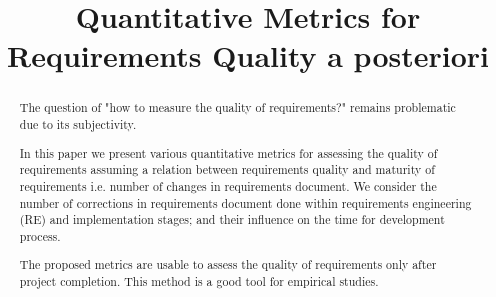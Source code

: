 \documentclass[conference]{IEEEtran}
\begin{document}
\title{Quantitative Metrics for Requirements Quality a posteriori} 

\author{
}

\maketitle

\begin{abstract}
The question of "how to measure the quality of requirements?" remains problematic due to its subjectivity.

In this paper we present various quantitative metrics for assessing the quality of requirements 
assuming a relation between requirements quality and maturity of requirements i.e. number of changes 
in requirements document. We consider the number of corrections in requirements document done 
within requirements engineering (RE) and implementation stages; and their influence on the time 
for development process.

The proposed metrics are usable to assess the quality of requirements only after project completion.
This method is a good tool for empirical studies.
\end{abstract}


\IEEEpeerreviewmaketitle












\end{document}

